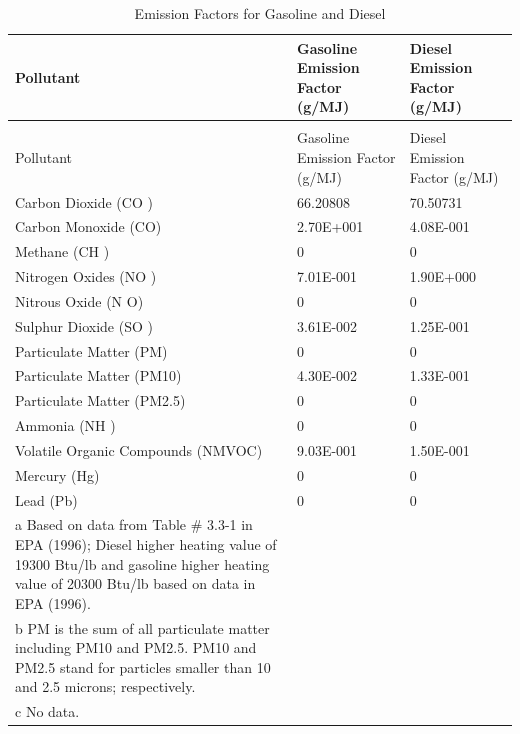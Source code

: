 \begin{longtable}[c]{p{3.0in}p{1.5in}p{1.5in}}
\caption{Emission Factors for Gasoline and Diesel \label{table:emission-factors-for-gasoline-and-diesel}} \tabularnewline
\toprule 
Pollutant & Gasoline Emission Factor   (g/MJ) & Diesel Emission Factor   (g/MJ) \tabularnewline
\midrule
\endfirsthead

\caption[]{Emission Factors for Gasoline and Diesel} \tabularnewline
\toprule 
Pollutant & Gasoline Emission Factor   (g/MJ) & Diesel Emission Factor   (g/MJ) \tabularnewline
\midrule
\endhead

Carbon Dioxide (CO  ) & 66.20808 & 70.50731 \tabularnewline
Carbon Monoxide (CO) & 2.70E+001 & 4.08E-001 \tabularnewline
Methane (CH  ) & 0 & 0 \tabularnewline
Nitrogen Oxides (NO  ) & 7.01E-001 & 1.90E+000 \tabularnewline
Nitrous Oxide (N  O) & 0 & 0 \tabularnewline
Sulphur Dioxide (SO  ) & 3.61E-002 & 1.25E-001 \tabularnewline
Particulate Matter (PM) & 0 & 0 \tabularnewline
Particulate Matter (PM10) & 4.30E-002 & 1.33E-001 \tabularnewline
Particulate Matter (PM2.5) & 0 & 0 \tabularnewline
Ammonia (NH  ) & 0 & 0 \tabularnewline
Volatile Organic Compounds (NMVOC) & 9.03E-001 & 1.50E-001 \tabularnewline
Mercury (Hg) & 0 & 0 \tabularnewline
Lead (Pb) & 0 & 0 \tabularnewline
a Based on data from Table \# 3.3-1 in EPA (1996); Diesel higher heating value of 19300 Btu/lb and gasoline higher heating value of 20300 Btu/lb based on data in EPA (1996). \tabularnewline
b PM is the sum of all particulate matter including PM10 and PM2.5. PM10 and PM2.5 stand for particles smaller than 10 and 2.5 microns; respectively. \tabularnewline
c No data. \tabularnewline
\bottomrule
\end{longtable}

